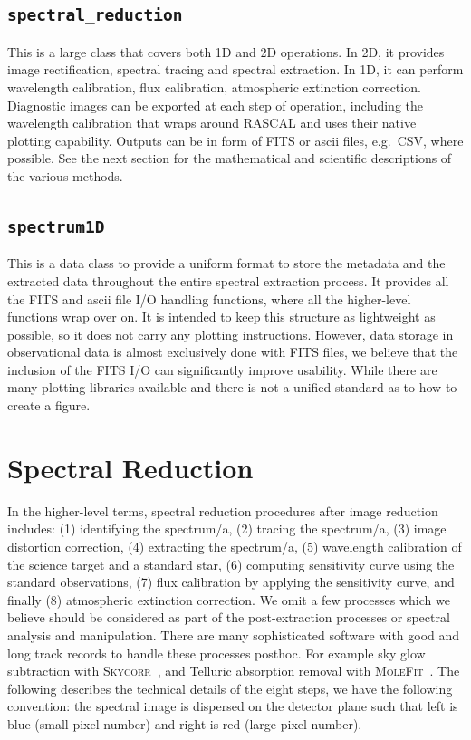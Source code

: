 \documentclass[fleqn,usenatbib]{mnras}
\begin{document}
\subsection*{\texttt{spectral\_reduction}}
This is a large class that covers both 1D and 2D operations. In 2D, it
provides image rectification, spectral tracing and spectral extraction.
In 1D, it can perform wavelength calibration, flux calibration, atmospheric
extinction correction. Diagnostic images can be exported at each step
of operation, including the wavelength calibration that wraps around
\textsc{RASCAL} and uses their native plotting capability. Outputs can
be in form of FITS or ascii files, e.g.\ CSV, where possible. See the next
section for the mathematical and scientific descriptions of the various
methods.

\subsection*{\texttt{spectrum1D}}
This is a data class to provide a uniform format to store the metadata
and the extracted data throughout the entire spectral extraction process.
It provides all the FITS and ascii file I/O handling functions, where all
the higher-level functions wrap over on. It is intended to keep this
structure as lightweight as possible, so it does not carry any plotting
instructions. However, data storage in observational data is almost
exclusively done with FITS files, we believe that the inclusion of the
FITS I/O can significantly improve usability. While there are many
plotting libraries available and there is not a unified standard
as to how to create a figure.

\section{Spectral Reduction}
In the higher-level terms, spectral reduction procedures after image
reduction includes: (1) identifying the spectrum/a, (2) tracing the
spectrum/a, (3) image distortion correction, (4) extracting the
spectrum/a, (5) wavelength calibration of the science target and a
standard star, (6) computing sensitivity curve using the standard
observations, (7) flux calibration by applying the sensitivity curve,
and finally (8) atmospheric extinction correction. We omit a few
processes which we believe should be considered as part of the
post-extraction processes or spectral analysis and manipulation.
There are many sophisticated software with good and long track records
to handle these processes posthoc. For example sky glow subtraction
with \textsc{Skycorr}~\citep{2014A&A...567A..25N}, and Telluric
absorption removal with
\textsc{MoleFit}~\citep{2015A&A...576A..77S, 2015A&A...576A..78K}.
The following describes the technical details of the eight steps,
we have the following convention: the spectral image is dispersed
on the detector plane such that left is blue (small pixel number)
and right is red (large pixel number).
\end{document}
